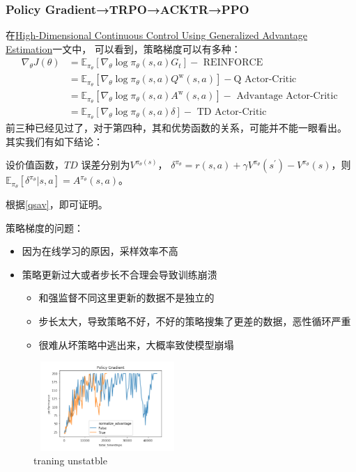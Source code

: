 \documentclass[UTF8]{ctexart}
\begin{document}
\subsubsection{Policy Gradient→TRPO→ACKTR→PPO}

在\href{https://arxiv.org/abs/1506.02438}{High-Dimensional Continuous Control Using Generalized Advantage Estimation}一文中，
可以看到，策略梯度可以有多种：
\begin{equation}\begin{aligned}
    \nabla_{\theta} J(\theta) &=\mathbb{E}_{\pi_{\theta}}\left[\nabla_{\theta} \log \pi_{\theta}(s, a) G_{t}\right]-\text { REINFORCE } \\
    &=\mathbb{E}_{\pi_{\theta}}\left[\nabla_{\theta} \log \pi_{\theta}(s, a) Q^{\mathrm{w}}(s, a)\right]-\mathrm{Q} \text { Actor-Critic } \\
    &=\mathbb{E}_{\pi_{\theta}}\left[\nabla_{\theta} \log \pi_{\theta}(s, a) A^{\mathrm{w}}(s, a)\right]-\text { Advantage Actor-Critic } \\
    &=\mathbb{E}_{\pi_{\theta}}\left[\nabla_{\theta} \log \pi_{\theta}(s, a) \delta\right]-\text { TD Actor-Critic }
    \end{aligned}
\end{equation}
前三种已经见过了，对于第四种，其和优势函数的关系，可能并不能一眼看出。
其实我们有如下结论：
\begin{corollary}
    设价值函数，$TD$ 误差分别为$V^{\pi_{\theta}(s)}$， $\delta^{\pi_{\theta}}=r(s, a)+\gamma V^{\pi_{\theta}}\left(s^{\prime}\right)-V^{\pi_{\theta}}(s)$，则
    $\mathbb{E}_{\pi_{\theta}}[\delta^{\pi_{\theta}}|s,a] = A^{\pi_{\theta}}(s,a)$。
\end{corollary}
根据\eqref{qsav}，即可证明。

策略梯度的问题：
\begin{itemize}
    \item 因为在线学习的原因，采样效率不高
    \item 策略更新过大或者步长不合理会导致训练崩溃
    \begin{itemize}
        \item 和强监督不同这里更新的数据不是独立的
        \item 步长太大，导致策略不好，不好的策略搜集了更差的数据，恶性循环严重
        \item 很难从坏策略中逃出来，大概率致使模型崩塌
    \end{itemize}
\end{itemize}

\begin{figure}[htbp]
	\centering
	\includegraphics[width=5.6cm, height=3.4cm]{./pic/traning_stable.png}
    \caption{traning unstatble}
    \label{traning:unstatble}
\end{figure}
\end{document}
